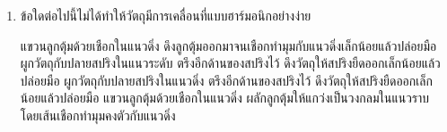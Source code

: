 \begin{enumerate}
	\item \runningj \nonet ข้อใดต่อไปนี้ไม่ได้ทำให้วัตถุมีการเคลื่อนที่แบบฮาร์มอนิกอย่างง่าย
	\begin{1c}
		{แขวนลูกตุ้มด้วยเชือกในแนวดิ่ง    ดึงลูกตุ้มออกมาจนเชือกทำมุมกับแนวดิ่งเล็กน้อยแล้วปล่อยมือ}
		{ผูกวัตถุกับปลายสปริงในแนวระดับ  ตรึงอีกด้านของสปริงไว้  ดึงวัตถุให้สปริงยืดออกเล็กน้อยแล้วปล่อยมือ}
		{ผูกวัตถุกับปลายสปริงในแนวดิ่ง   ตรึงอีกด้านของสปริงไว้  ดึงวัตถุให้สปริงยืดออกเล็กน้อยแล้วปล่อยมือ}
		{แขวนลูกตุ้มด้วยเชือกในแนวดิ่ง  ผลักลูกตุ้มให้แกว่งเป็นวงกลมในแนวราบ   โดยเส้นเชือกทำมุมคงตัวกับแนวดิ่ง}
	\end{1c}
\end{enumerate}
